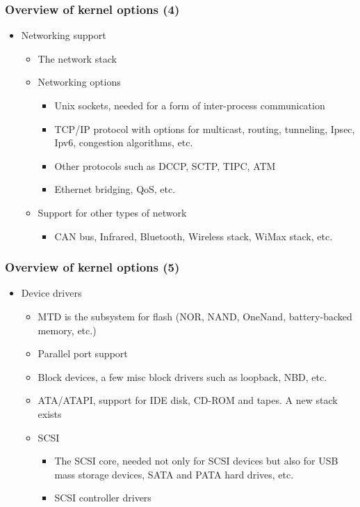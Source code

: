 \begin{frame}
  \frametitle{Overview of kernel options (4)}
  \begin{itemize}
  \item Networking support
    \begin{itemize}
    \item The network stack
    \item Networking options
      \begin{itemize}
      \item Unix sockets, needed for a form of inter-process
        communication
      \item TCP/IP protocol with options for multicast, routing,
        tunneling, Ipsec, Ipv6, congestion algorithms, etc.
      \item Other protocols such as DCCP, SCTP, TIPC, ATM
      \item Ethernet bridging, QoS, etc.
      \end{itemize}
    \item Support for other types of network
      \begin{itemize}
      \item CAN bus, Infrared, Bluetooth, Wireless stack, WiMax stack,
        etc.
      \end{itemize}
    \end{itemize}
  \end{itemize}
\end{frame}

\begin{frame}
  \frametitle{Overview of kernel options (5)}
  \begin{itemize}
  \item Device drivers
    \begin{itemize}
    \item MTD is the subsystem for flash (NOR, NAND, OneNand,
      battery-backed memory, etc.)
    \item Parallel port support
    \item Block devices, a few misc block drivers such as loopback,
      NBD, etc.
    \item ATA/ATAPI, support for IDE disk, CD-ROM and tapes. A new
      stack exists
    \item SCSI
      \begin{itemize}
      \item The SCSI core, needed not only for SCSI devices but also
        for USB mass storage devices, SATA and PATA hard drives, etc.
      \item SCSI controller drivers
      \end{itemize}
    \end{itemize}
  \end{itemize}
\end{frame}

